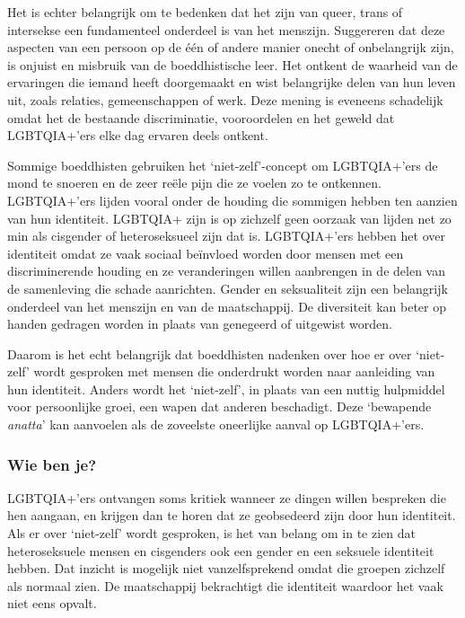 \documentclass[12pt,openany]{book}
\begin{document}
Het is echter belangrijk om te bedenken dat het zijn van queer, trans of intersekse een fundamenteel onderdeel is van het menszijn. Suggereren dat deze aspecten van een persoon op de één of andere manier onecht of onbelangrijk zijn, is onjuist en misbruik van de boeddhistische leer. Het ontkent de waarheid van de ervaringen die iemand heeft doorgemaakt en wist belangrijke delen van hun leven uit, zoals relaties, gemeenschappen of werk. Deze mening is eveneens schadelijk omdat het de bestaande discriminatie, vooroordelen en het geweld dat LGBTQIA+'ers elke dag ervaren deels ontkent. 

Sommige boeddhisten gebruiken het `niet-zelf'-concept om LGBTQIA+'ers de mond te snoeren en de zeer reële pijn die ze voelen zo te ontkennen. LGBTQIA+'ers lijden vooral onder de houding die sommigen hebben ten aanzien van hun identiteit. LGBTQIA+ zijn is op zichzelf geen oorzaak van lijden net zo min als cisgender of heteroseksueel zijn dat is. LGBTQIA+'ers hebben het over identiteit omdat ze vaak sociaal beïnvloed worden door mensen met een discriminerende houding en ze veranderingen willen aanbrengen in de delen van de samenleving die schade aanrichten. Gender en seksualiteit zijn een belangrijk onderdeel van het menszijn en van de maatschappij. De diversiteit kan beter op handen gedragen worden in plaats van genegeerd of uitgewist worden. 

Daarom is het echt belangrijk dat boeddhisten nadenken over hoe er over `niet-zelf' wordt gesproken met mensen die onderdrukt worden naar aanleiding van hun identiteit. Anders wordt het `niet-zelf', in plaats van een nuttig hulpmiddel voor persoonlijke groei, een wapen dat anderen beschadigt. Deze `bewapende \textit{anatta}' kan aanvoelen als de zoveelste oneerlijke aanval op LGBTQIA+'ers.  

\subsubsection*{Wie ben je?}

LGBTQIA+'ers ontvangen soms kritiek wanneer ze dingen willen bespreken die hen aangaan, en krijgen dan te horen dat ze geobsedeerd zijn door hun identiteit. Als er over `niet-zelf' wordt gesproken, is het van belang om in te zien dat heteroseksuele mensen en cisgenders ook een gender en een seksuele identiteit hebben. Dat inzicht is mogelijk niet vanzelfsprekend omdat die groepen zichzelf als normaal zien. De maatschappij bekrachtigt die identiteit waardoor het vaak niet eens opvalt.
\end{document}
